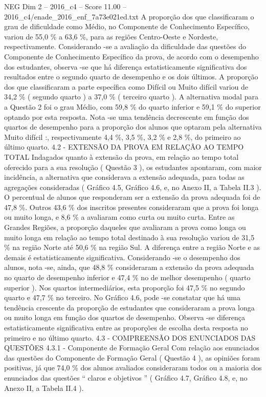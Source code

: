 \begin{textsample}{NEG Dim 2 – 2016\_c4 – Score 11.00 – 2016\_c4/enade\_2016\_enf\_7a73e021ed.txt}
A proporção dos que classificaram o grau de dificuldade como Médio, no Componente de Conhecimento Específico, variou de 55,0 \% a 63,6 \%, para as regiões Centro-Oeste e Nordeste, respectivamente.
Considerando -se a avaliação da dificuldade das questões do Componente de Conhecimento Específico da prova, de acordo com o desempenho dos estudantes, observa -se que há diferença estatisticamente significativa dos resultados entre o segundo quarto de desempenho e os dois últimos.
A proporção dos que classificaram a parte específica como Difícil ou Muito difícil variou de 34,2 \% ( segundo quarto ) a 37,0 \% ( terceiro quarto ).
A alternativa modal para a Questão 2 foi o grau Médio, com 59,8 \% do quarto inferior e 59,1 \% do superior optando por esta resposta.
Nota -se uma tendência decrescente em função dos quartos de desempenho para a proporção dos alunos que optaram pela alternativa Muito difícil :, respectivamente 4,4 \%, 3,5 \%, 3,2 \% e 2,8 \%, do primeiro ao último quarto. 4.2 - EXTENSÃO DA PROVA EM RELAÇÃO AO TEMPO TOTAL Indagados quanto à extensão da prova, em relação ao tempo total oferecido para a sua resolução ( Questão 3 ), os estudantes apontaram, com maior incidência, a alternativa que considerava a extensão adequada, para todas as agregações consideradas ( Gráfico 4.5, Gráfico 4.6, e, no Anexo II, a Tabela II.3 ).
O percentual de alunos que responderam ser a extensão da prova adequada foi de 47,8 \%.
Outros 43,6 \% dos inscritos presentes consideraram que a prova foi longa ou muito longa, e 8,6 \% a avaliaram como curta ou muito curta.
Entre as Grandes Regiões, a proporção daqueles que avaliaram a prova como longa ou muito longa em relação ao tempo total destinado à sua resolução variou de 31,5 \% na região Norte até 50,6 \% na região Sul.
A diferença entre a região Norte e as demais é estatisticamente significativa.
Considerando -se o desempenho dos alunos, nota -se, ainda, que 48,8 \% consideraram a extensão da prova adequada no quarto de desempenho inferior e 47,4 \% no de melhor desempenho ( quarto superior ).
Nos quartos intermediários, esta proporção foi 47,5 \% no segundo quarto e 47,7 \% no terceiro.
No Gráfico 4.6, pode -se constatar que há uma tendência crescente da proporção de estudantes que consideraram a prova longa ou muito longa em função dos quartos de desempenho.
Observa -se diferença estatisticamente significativa entre as proporções de escolha desta resposta no primeiro e no último quarto. 4.3 - COMPREENSÃO DOS ENUNCIADOS DAS QUESTÕES 4.3.1 - Componente de Formação Geral Com relação aos enunciados das questões do Componente de Formação Geral ( Questão 4 ), as opiniões foram positivas, já que 74,0 \% dos alunos avaliados consideraram todos ou a maioria dos enunciados das questões “ claros e objetivos ” ( Gráfico 4.7, Gráfico 4.8, e, no Anexo II, a Tabela II.4 ).

\end{textsample}
